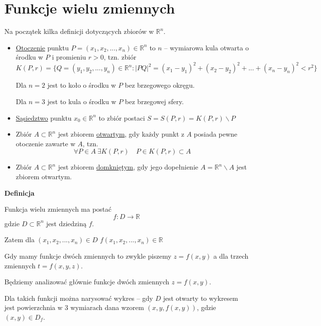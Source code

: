 \section{Funkcje wielu zmiennych}

Na początek kilka definicji dotyczących zbiorów w $ \mathbb{R}^n $.

\begin{itemize}
    \item \underline{Otoczenie} punktu $ P = (x_1, x_2, ..., x_n) \in \mathbb{R}^n $ to $n$ -- wymiarowa kula otwarta o środku
    w $P$ i promieniu $r > 0$, tzn. zbiór
    $$ K(P, r) = \{ Q = (y_1, y_2, ..., y_n) \in \mathbb{R}^n : |PQ|^2 = (x_1 - y_1)^2 + (x_2 - y_2)^2 + ... + (x_n - y_n)^2 < r^2 \} $$

    Dla $n=2$ jest to koło o środku w $P$ bez brzegowego okręgu.

    Dla $n=3$ jest to kula o środku w $P$ bez brzegowej sfery.
    \item \underline{Sąsiedztwo} punktu $x_0 \in \mathbb{R}^n$ to zbiór postaci $ S = S(P, r) = K(P,r) \backslash P $
    \item Zbiór $ A \subset \mathbb{R}^n $ jest zbiorem \underline{otwartym}, gdy każdy punkt z $A$ posiada pewne otoczenie zawarte w $A$, tzn.
    $$ \forall P \!\in\! A \ \exists K(P, r) \quad P\in K(P,r) \subset A $$
    \item Zbiór $ A \subset \mathbb{R}^n $ jest zbiorem \underline{domkniętym}, gdy jego dopełnienie $ A = \mathbb{R}^n \backslash A $ jest zbiorem otwartym. \\
\end{itemize}

\textbf{Definicja}

Funkcja wielu zmiennych ma postać
$$ f: D \to \mathbb{R} $$
gdzie $ D \subset \mathbb{R}^n $ jest dziedziną $f$.

Zatem dla $ (x_1, x_2, ..., x_n) \in D $ \quad $ f(x_1, x_2, ..., x_n) \in \mathbb{R} $

Gdy mamy funkcje dwóch zmiennych to zwykle piszemy $ z = f(x, y) $ a dla trzech zmiennych $ t = f(x, y, z) $.

Będziemy analizować głównie funkcje dwóch zmiennych $ z = f(x, y) $.

Dla takich funkcji można narysować wykres -- gdy $D$ jest otwarty to wykresem jest powierzchnia w $3$ wymiarach dana wzorem
$ (x, y, f(x,y)) $, gdzie $ (x,y) \in D_f $.

